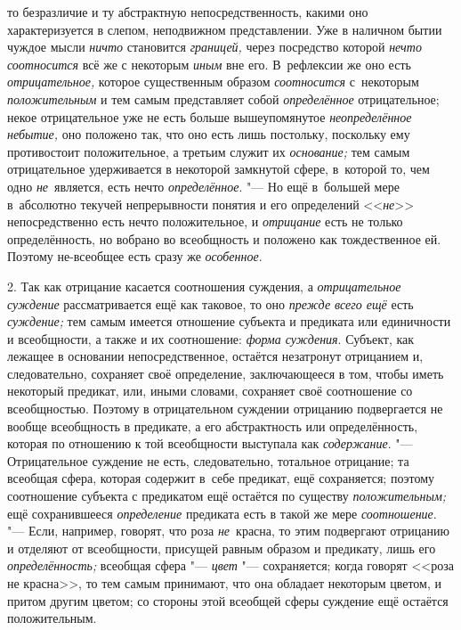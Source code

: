 то безразличие и ту абстрактную непосредственность, какими оно характеризуется
в слепом, неподвижном представлении. Уже в наличном бытии чуждое мысли
{\em ничто} становится {\em границей,} через посредство которой
{\em нечто соотносится} всё же с некоторым {\em иным} вне его. В~рефлексии же
оно есть {\em отрицательное,} которое существенным образом {\em соотносится}
с~некоторым {\em положительным} и тем самым представляет собой
{\em определённое} отрицательное; некое отрицательное уже не есть больше
вышеупомянутое {\em неопределённое небытие,} оно положено так, что оно есть
лишь постольку, поскольку ему противостоит положительное, а третьим служит их
{\em основание;} тем самым отрицательное удерживается в некоторой замкнутой
сфере, в~которой то, чем одно {\em не}~является, есть нечто {\em определённое}.
"--- Но ещё в~большей мере в~абсолютно текучей непрерывности понятия и его
определений <<{\em не}>> непосредственно есть нечто
положительное, и {\em отрицание} есть не только определённость,
но вобрано во всеобщность и положено как тождественное ей. Поэтому
не-всеобщее есть сразу же {\em особенное}.

2. Так как отрицание касается соотношения суждения, а
{\em отрицательное суждение} рассматривается ещё как таковое, то оно
{\em прежде всего ещё} есть {\em суждение;}
тем самым имеется отношение субъекта и предиката или
единичности и всеобщности, а также и их соотношение: {\em форма суждения}.
Субъект, как лежащее в основании непосредственное, остаётся
незатронут отрицанием и, следовательно, сохраняет своё определение,
заключающееся в том, чтобы иметь некоторый предикат, или, иными словами,
сохраняет своё соотношение со всеобщностью. Поэтому в отрицательном
суждении отрицанию подвергается не вообще всеобщность в предикате, а его
абстрактность или определённость, которая по отношению к той всеобщности
выступала как {\em содержание}. "---
Отрицательное суждение не есть, следовательно, тотальное
отрицание; та всеобщая сфера, которая содержит в~себе предикат, ещё
сохраняется; поэтому соотношение субъекта с предикатом ещё остаётся по
существу {\em положительным;} ещё сохранившееся {\em определение}
предиката есть в такой же мере {\em соотношение}. "--- Если, например,
говорят, что роза {\em не}~красна, то этим подвергают отрицанию и отделяют
от всеобщности, присущей равным образом и предикату, лишь его
{\em определённость;} всеобщая сфера "--- {\em цвет}
"--- сохраняется; когда говорят <<роза не красна>>, то тем самым
принимают, что она обладает некоторым цветом, и притом другим цветом; со
стороны этой всеобщей сферы суждение ещё остаётся положительным.

